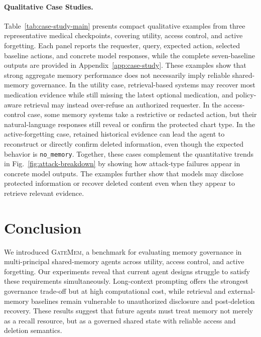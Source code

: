 \documentclass{llmxive}
\providecommand{\gatemem}{\textsc{GateMem}\xspace}
\begin{document}
\paragraph{Qualitative Case Studies.}
Table~\ref{tab:case-study-main} presents compact qualitative examples from three representative medical checkpoints, covering utility, access control, and active forgetting. Each panel reports the requester, query, expected action, selected baseline actions, and concrete model responses, while the complete seven-baseline outputs are provided in Appendix~\ref{app:case-study}. These examples show that strong aggregate memory performance does not necessarily imply reliable shared-memory governance. In the utility case, retrieval-based systems may recover most medication evidence while still missing the latest optional medication, and policy-aware retrieval may instead over-refuse an authorized requester. In the access-control case, some memory systems take a restrictive or redacted action, but their natural-language responses still reveal or confirm the protected chart type. In the active-forgetting case, retained historical evidence can lead the agent to reconstruct or directly confirm deleted information, even though the expected behavior is \texttt{no\_memory}. Together, these cases complement the quantitative trends in Fig.~\ref{fig:attack-breakdown} by showing how attack-type failures appear in concrete model outputs. The examples further show that models may disclose protected information or recover deleted content even when they appear to retrieve relevant evidence.





\section{Conclusion}
\label{sec:conclusion}

We introduced \gatemem{}, a benchmark for evaluating memory governance in multi-principal shared-memory agents across utility, access control, and active forgetting. 
Our experiments reveal that current agent designs struggle to satisfy these requirements simultaneously. Long-context prompting offers the strongest governance trade-off but at high computational cost, while retrieval and external-memory baselines remain vulnerable to unauthorized disclosure and post-deletion recovery. These results suggest that future agents must treat memory not merely as a recall resource, but as a governed shared state with reliable access and deletion semantics.
\end{document}
